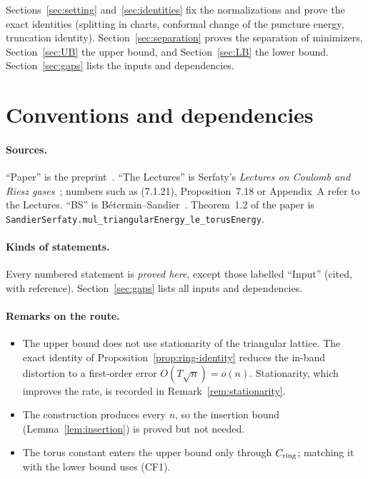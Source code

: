\documentclass[11pt]{article}
\theoremstyle{definition}
\theoremstyle{remark}
\newcommand{\lean}[1]{\texttt{#1}}
\begin{document}
Sections~\ref{sec:setting} and~\ref{sec:identities} fix the normalizations and prove the exact identities (splitting in charts,
conformal change of the puncture energy, truncation identity). Section~\ref{sec:separation} proves the separation of minimizers,
Section~\ref{sec:UB} the upper bound, and Section~\ref{sec:LB} the lower bound. Section~\ref{sec:gaps} lists the inputs and
dependencies.

\tableofcontents

\section{Conventions and dependencies}\label{sec:status}

\paragraph{Sources.}
``Paper'' is the preprint~\cite{Preprint}. ``The Lectures'' is Serfaty's \emph{Lectures on Coulomb and Riesz gases}~\cite{Lectures};
numbers such as (7.1.21), Proposition~7.18 or Appendix~A refer to the Lectures. ``BS'' is B\'etermin--Sandier~\cite{BeterminSandier2018}.
Theorem~1.2 of the paper is \lean{SandierSerfaty.mul\_triangularEnergy\_le\_torusEnergy}.

\paragraph{Kinds of statements.}
Every numbered statement is \emph{proved here}, except those labelled ``Input'' (cited, with
reference). Section~\ref{sec:gaps} lists all inputs and dependencies.

\paragraph{Remarks on the route.}
\begin{itemize}[leftmargin=*]
\item The upper bound does not use stationarity of the triangular lattice. The exact identity of
  Proposition~\ref{prop:ring-identity} reduces the in-band distortion to a first-order error
  $O(T\sqrt n)=o(n)$. Stationarity, which improves the rate, is recorded in
  Remark~\ref{rem:stationarity}.
\item The construction produces every $n$, so the insertion bound
  (Lemma~\ref{lem:insertion}) is proved but not needed.
\item The torus constant enters the upper bound only through $C_{\rm ring}$; matching it with the
  lower bound uses (CF1).
\end{itemize}
\end{document}
